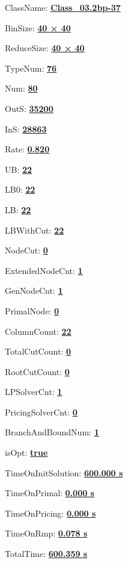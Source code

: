 \documentclass[11pt]{article}
\begin{document}
\pagestyle{empty}


ClassName: \underline{\textbf{Class_03.2bp-37}}
\par
BinSize: \underline{\textbf{40 × 40}}
\par
ReduceSize: \underline{\textbf{40 × 40}}
\par
TypeNum: \underline{\textbf{76}}
\par
Num: \underline{\textbf{80}}
\par
OutS: \underline{\textbf{35200}}
\par
InS: \underline{\textbf{28863}}
\par
Rate: \underline{\textbf{0.820}}
\par
UB: \underline{\textbf{22}}
\par
LB0: \underline{\textbf{22}}
\par
LB: \underline{\textbf{22}}
\par
LBWithCut: \underline{\textbf{22}}
\par
NodeCut: \underline{\textbf{0}}
\par
ExtendedNodeCnt: \underline{\textbf{1}}
\par
GenNodeCnt: \underline{\textbf{1}}
\par
PrimalNode: \underline{\textbf{0}}
\par
ColumnCount: \underline{\textbf{22}}
\par
TotalCutCount: \underline{\textbf{0}}
\par
RootCutCount: \underline{\textbf{0}}
\par
LPSolverCnt: \underline{\textbf{1}}
\par
PricingSolverCnt: \underline{\textbf{0}}
\par
BranchAndBoundNum: \underline{\textbf{1}}
\par
isOpt: \underline{\textbf{true}}
\par
TimeOnInitSolution: \underline{\textbf{600.000 s}}
\par
TimeOnPrimal: \underline{\textbf{0.000 s}}
\par
TimeOnPricing: \underline{\textbf{0.000 s}}
\par
TimeOnRmp: \underline{\textbf{0.078 s}}
\par
TotalTime: \underline{\textbf{600.359 s}}
\par
\newpage


\end{document}
